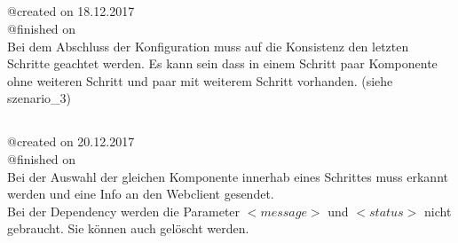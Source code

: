\documentclass{article}
\begin{document}
\subsection{}
@created on 18.12.2017\\
@finished on \\

Bei dem Abschluss der Konfiguration muss auf die Konsistenz den letzten
Schritte geachtet werden. Es kann sein dass in einem Schritt paar Komponente
ohne weiteren Schritt und paar mit weiterem Schritt vorhanden. (siehe
szenario\_3)\\

\subsection{}
@created on 20.12.2017\\
@finished on \\

Bei der Auswahl der gleichen Komponente innerhab eines Schrittes muss erkannt
werden und eine Info an den Webclient gesendet.\\

Bei der Dependency werden die Parameter $<message>$ und $<status>$ nicht
gebraucht. Sie k\"onnen auch gel\"oscht werden.
\end{document}

